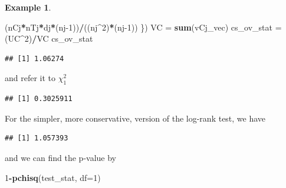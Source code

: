 \documentclass[
  openany]{book}
\newenvironment{Shaded}{\begin{snugshade}}{\end{snugshade}}
\newcommand{\AttributeTok}[1]{\textcolor[rgb]{0.13,0.29,0.53}{#1}}
\newcommand{\DecValTok}[1]{\textcolor[rgb]{0.00,0.00,0.81}{#1}}
\newcommand{\FunctionTok}[1]{\textcolor[rgb]{0.13,0.29,0.53}{\textbf{#1}}}
\newcommand{\NormalTok}[1]{#1}
\newcommand{\OtherTok}[1]{\textcolor[rgb]{0.56,0.35,0.01}{#1}}
\newcommand{\SpecialCharTok}[1]{\textcolor[rgb]{0.81,0.36,0.00}{\textbf{#1}}}
\theoremstyle{definition}
\theoremstyle{definition}
\newtheorem{example}{Example}[chapter]
\theoremstyle{definition}
\theoremstyle{definition}
\theoremstyle{remark}
\begin{document}
\begin{example}
\begin{Shaded}
\begin{Highlighting}[]
\NormalTok{    (nCj}\SpecialCharTok{*}\NormalTok{nTj}\SpecialCharTok{*}\NormalTok{dj}\SpecialCharTok{*}\NormalTok{(nj}\DecValTok{{-}1}\NormalTok{))}\SpecialCharTok{/}\NormalTok{((nj}\SpecialCharTok{\^{}}\DecValTok{2}\NormalTok{)}\SpecialCharTok{*}\NormalTok{(nj}\DecValTok{{-}1}\NormalTok{))}
\NormalTok{\})}
\NormalTok{VC }\OtherTok{=} \FunctionTok{sum}\NormalTok{(vCj\_vec)}
\NormalTok{cs\_ov\_stat }\OtherTok{=}\NormalTok{ (UC}\SpecialCharTok{\^{}}\DecValTok{2}\NormalTok{)}\SpecialCharTok{/}\NormalTok{VC}
\NormalTok{cs\_ov\_stat}
\end{Highlighting}
\end{Shaded}

\begin{verbatim}
## [1] 1.06274
\end{verbatim}

and refer it to \(\chi^2_1\)

\begin{verbatim}
## [1] 0.3025911
\end{verbatim}

For the simpler, more conservative, version of the log-rank test, we have

\begin{Shaded}
\end{Shaded}

\begin{verbatim}
## [1] 1.057393
\end{verbatim}

and we can find the p-value by

\begin{Shaded}
\begin{Highlighting}[]
\DecValTok{1}\SpecialCharTok{{-}}\FunctionTok{pchisq}\NormalTok{(test\_stat, }\AttributeTok{df=}\DecValTok{1}\NormalTok{)}
\end{Highlighting}
\end{Shaded}


\end{example}
\end{document}
